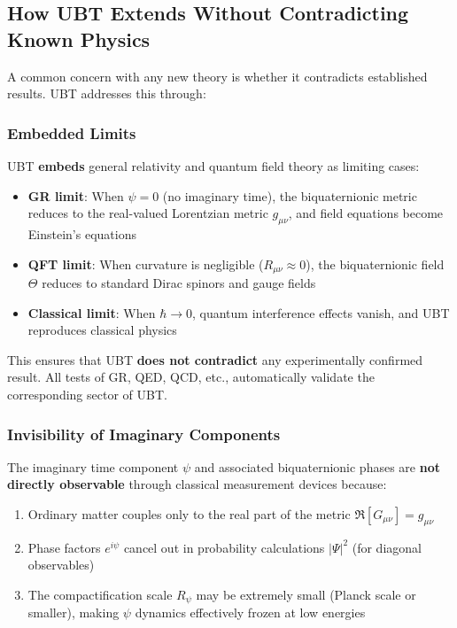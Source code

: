 \subsection{How UBT Extends Without Contradicting Known Physics}

A common concern with any new theory is whether it contradicts established results. UBT addresses this through:

\subsubsection{Embedded Limits}

UBT \textbf{embeds} general relativity and quantum field theory as limiting cases:
\begin{itemize}
\item \textbf{GR limit}: When $\psi = 0$ (no imaginary time), the biquaternionic metric reduces to the real-valued Lorentzian metric $g_{\mu\nu}$, and field equations become Einstein's equations
\item \textbf{QFT limit}: When curvature is negligible ($R_{\mu\nu} \approx 0$), the biquaternionic field $\Theta$ reduces to standard Dirac spinors and gauge fields
\item \textbf{Classical limit}: When $\hbar \to 0$, quantum interference effects vanish, and UBT reproduces classical physics
\end{itemize}

This ensures that UBT \textbf{does not contradict} any experimentally confirmed result. All tests of GR, QED, QCD, etc., automatically validate the corresponding sector of UBT.

\subsubsection{Invisibility of Imaginary Components}

The imaginary time component $\psi$ and associated biquaternionic phases are \textbf{not directly observable} through classical measurement devices because:
\begin{enumerate}
\item Ordinary matter couples only to the real part of the metric $\Re[G_{\mu\nu}] = g_{\mu\nu}$
\item Phase factors $e^{i\psi}$ cancel out in probability calculations $|\Psi|^2$ (for diagonal observables)
\item The compactification scale $R_\psi$ may be extremely small (Planck scale or smaller), making $\psi$ dynamics effectively frozen at low energies
\end{enumerate}

